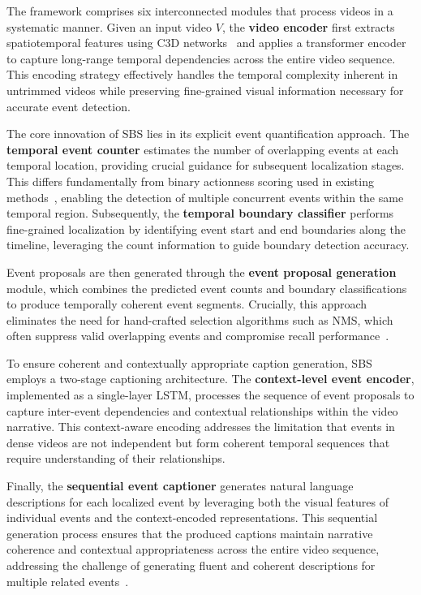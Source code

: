 The framework comprises six interconnected modules that process videos in a systematic manner.
Given an input video $V$, the \textbf{video encoder} first extracts spatiotemporal features using C3D networks~\cite{Tran2015-uq} and applies a transformer encoder~\cite{Vaswani2017-sc} to capture long-range temporal dependencies across the entire video sequence.
This encoding strategy effectively handles the temporal complexity inherent in untrimmed videos while preserving fine-grained visual information necessary for accurate event detection.

The core innovation of SBS lies in its explicit event quantification approach.
The \textbf{temporal event counter} estimates the number of overlapping events at each temporal location, providing crucial guidance for subsequent localization stages.
This differs fundamentally from binary actionness scoring used in existing methods~\cite{lin2018bsn,buch2017sst}, enabling the detection of multiple concurrent events within the same temporal region.
Subsequently, the \textbf{temporal boundary classifier} performs fine-grained localization by identifying event start and end boundaries along the timeline, leveraging the count information to guide boundary detection accuracy.

Event proposals are then generated through the \textbf{event proposal generation} module, which combines the predicted event counts and boundary classifications to produce temporally coherent event segments.
Crucially, this approach eliminates the need for hand-crafted selection algorithms such as NMS, which often suppress valid overlapping events and compromise recall performance~\cite{hosang2017learning}.

To ensure coherent and contextually appropriate caption generation, SBS employs a two-stage captioning architecture.
The \textbf{context-level event encoder}, implemented as a single-layer LSTM, processes the sequence of event proposals to capture inter-event dependencies and contextual relationships within the video narrative.
This context-aware encoding addresses the limitation that events in dense videos are not independent but form coherent temporal sequences that require understanding of their relationships.

Finally, the \textbf{sequential event captioner} generates natural language descriptions for each localized event by leveraging both the visual features of individual events and the context-encoded representations.
This sequential generation process ensures that the produced captions maintain narrative coherence and contextual appropriateness across the entire video sequence, addressing the challenge of generating fluent and coherent descriptions for multiple related events~\cite{Yu2016-il,Lei2020-tg}.

